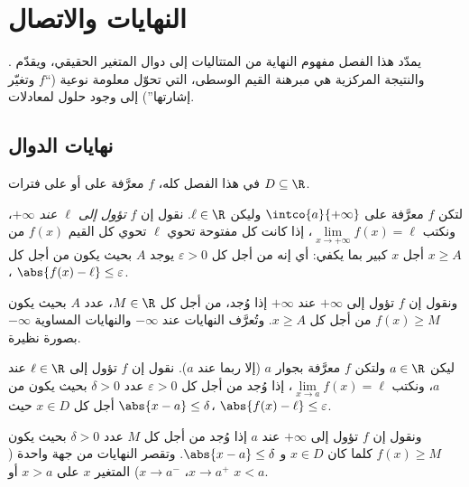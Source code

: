 \chapter{النهايات والاتصال}\label{ch:g12:limcont}

يمدّد هذا الفصل مفهوم النهاية من المتتاليات إلى دوال المتغير
الحقيقي، ويقدّم . والنتيجة المركزية هي
مبرهنة القيم الوسطى، التي تحوّل معلومة نوعية (``$f$
 وتغيّر إشارتها'') إلى وجود حلول لمعادلات.

\section{نهايات الدوال}

في هذا الفصل كله، $f$  معرَّفة على  أو على  فترات
$D \subseteq \R$.

\begin{definition}\label{def:g12:limcont:liminf}
لتكن $f$ معرَّفة على  $\intco{a}{+\infty}$ وليكن $\ell \in \R$. نقول
إن $f$ \emph{تؤول إلى $\ell$ عند $+\infty$}،
ونكتب $\lim\limits_{x\to+\infty} f(x) = \ell$، إذا كانت كل  مفتوحة
تحوي $\ell$ تحوي كل القيم $f(x)$ من أجل $x$ كبير بما يكفي:
أي إنه من أجل كل $\varepsilon > 0$ يوجد $A$ بحيث يكون من أجل كل $x \geq A$،
$\abs{f(x) - \ell} \leq \varepsilon$.

ونقول إن $f$ تؤول إلى $+\infty$ عند $+\infty$ إذا وُجد، من أجل كل $M \in \R$،
عدد $A$ بحيث يكون $f(x) \geq M$ من أجل كل $x \geq A$. وتُعرَّف النهايات عند $-\infty$
والنهايات المساوية $-\infty$ بصورة نظيرة.
\end{definition}

\begin{definition}\label{def:g12:limcont:limpoint}
ليكن $a \in \R$ ولتكن $f$ معرَّفة بجوار $a$ (إلا ربما عند $a$). نقول
إن $f$ تؤول إلى $\ell \in \R$ عند $a$، ونكتب
$\lim\limits_{x \to a} f(x) = \ell$، إذا وُجد من أجل كل $\varepsilon > 0$
عدد $\delta > 0$ بحيث يكون من أجل كل $x \in D$ حيث
$\abs{x - a} \leq \delta$، $\abs{f(x) - \ell} \leq \varepsilon$.

ونقول إن $f$ تؤول إلى $+\infty$ عند $a$ إذا وُجد من أجل كل $M$ عدد $\delta > 0$
بحيث يكون $f(x) \geq M$ كلما كان $x \in D$ و $\abs{x - a} \leq \delta$.
وتقصر النهايات من جهة واحدة ($x \to a^+$، $x \to a^-$) المتغير $x$ على $x > a$ أو
$x < a$.
\end{definition}

